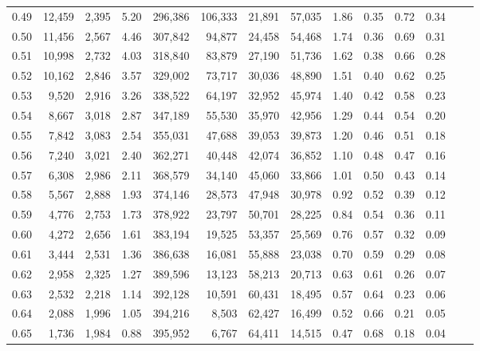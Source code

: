 \begin{tabular}{rrrrrrrrrrrrrr}
0.49 &  12,459 &  2,395 &     5.20 &  296,386 &  106,333 &  21,891 &  57,035 &  1.86 &  0.35 &  0.72 &      0.34 \\
0.50 &  11,456 &  2,567 &     4.46 &  307,842 &   94,877 &  24,458 &  54,468 &  1.74 &  0.36 &  0.69 &      0.31 \\
0.51 &  10,998 &  2,732 &     4.03 &  318,840 &   83,879 &  27,190 &  51,736 &  1.62 &  0.38 &  0.66 &      0.28 \\
0.52 &  10,162 &  2,846 &     3.57 &  329,002 &   73,717 &  30,036 &  48,890 &  1.51 &  0.40 &  0.62 &      0.25 \\
0.53 &   9,520 &  2,916 &     3.26 &  338,522 &   64,197 &  32,952 &  45,974 &  1.40 &  0.42 &  0.58 &      0.23 \\
0.54 &   8,667 &  3,018 &     2.87 &  347,189 &   55,530 &  35,970 &  42,956 &  1.29 &  0.44 &  0.54 &      0.20 \\
0.55 &   7,842 &  3,083 &     2.54 &  355,031 &   47,688 &  39,053 &  39,873 &  1.20 &  0.46 &  0.51 &      0.18 \\
0.56 &   7,240 &  3,021 &     2.40 &  362,271 &   40,448 &  42,074 &  36,852 &  1.10 &  0.48 &  0.47 &      0.16 \\
0.57 &   6,308 &  2,986 &     2.11 &  368,579 &   34,140 &  45,060 &  33,866 &  1.01 &  0.50 &  0.43 &      0.14 \\
0.58 &   5,567 &  2,888 &     1.93 &  374,146 &   28,573 &  47,948 &  30,978 &  0.92 &  0.52 &  0.39 &      0.12 \\
0.59 &   4,776 &  2,753 &     1.73 &  378,922 &   23,797 &  50,701 &  28,225 &  0.84 &  0.54 &  0.36 &      0.11 \\
0.60 &   4,272 &  2,656 &     1.61 &  383,194 &   19,525 &  53,357 &  25,569 &  0.76 &  0.57 &  0.32 &      0.09 \\
0.61 &   3,444 &  2,531 &     1.36 &  386,638 &   16,081 &  55,888 &  23,038 &  0.70 &  0.59 &  0.29 &      0.08 \\
0.62 &   2,958 &  2,325 &     1.27 &  389,596 &   13,123 &  58,213 &  20,713 &  0.63 &  0.61 &  0.26 &      0.07 \\
0.63 &   2,532 &  2,218 &     1.14 &  392,128 &   10,591 &  60,431 &  18,495 &  0.57 &  0.64 &  0.23 &      0.06 \\
0.64 &   2,088 &  1,996 &     1.05 &  394,216 &    8,503 &  62,427 &  16,499 &  0.52 &  0.66 &  0.21 &      0.05 \\
0.65 &   1,736 &  1,984 &     0.88 &  395,952 &    6,767 &  64,411 &  14,515 &  0.47 &  0.68 &  0.18 &      0.04 \\

\end{tabular}
